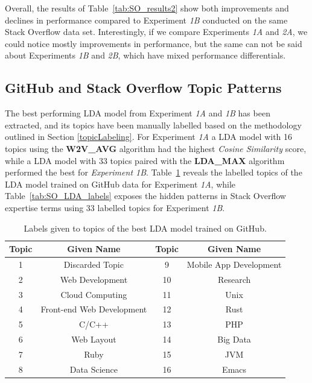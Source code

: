             Overall, the results of Table~\ref{tab:SO_results2} show both improvements and declines in performance compared to Experiment \emph{1B} conducted on the same Stack Overflow data set. Interestingly, if we compare Experiments \emph{1A} and \emph{2A}, we could notice mostly improvements in performance, but the same can not be said about Experiments \emph{1B} and \emph{2B}, which have mixed performance differentials. 
            
        \subsection{GitHub and Stack Overflow Topic Patterns\label{topic_patterns}}
        
            The best performing LDA model from Experiment \emph{1A} and \emph{1B} has been extracted, and its topics have been manually labelled based on the methodology outlined in Section \ref{topicLabeling}. For Experiment \emph{1A} a LDA model with 16 topics using the \textbf{W2V\_AVG} algorithm had the highest \emph{Cosine Similarity} score, while a LDA model with 33 topics paired with the \textbf{LDA\_MAX} algorithm performed the best for \emph{Experiment 1B}. Table~\ref{tab:GH_LDA_labels} reveals the labelled topics of the LDA model trained on GitHub data for Experiment \emph{1A}, while Table~\ref{tab:SO_LDA_labels} exposes the hidden patterns in Stack Overflow expertise terms using 33 labelled topics for Experiment \emph{1B}.
     
            \begin{table}
              \centering
              \caption{Labels given to topics of the best LDA model trained on GitHub.}\label{tab:GH_LDA_labels}
                \vspace{6pt} %
              \begin{tabular}{|c c|c c|}
                \hline
                Topic & Given Name & Topic & Given Name \\
                \hline
                1 & Discarded Topic & 9 & Mobile App Development \\
                2 & Web Development & 10 & Research \\
                3 & Cloud Computing & 11 & Unix \\
                4 & Front-end Web Development & 12 & Rust \\
                5 & C/C++ & 13 & PHP \\
                6 & Web Layout & 14 & Big Data \\
                7 & Ruby & 15 & JVM \\
                8 & Data Science & 16 & Emacs \\
                \hline
              \end{tabular}%
            \end{table}
            
